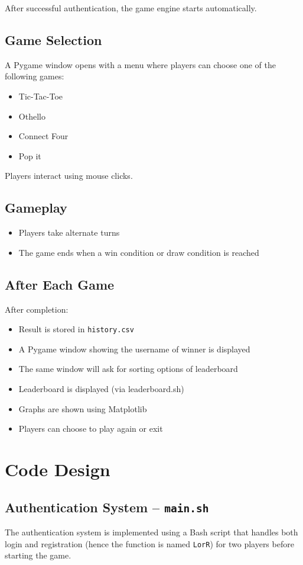\documentclass[12pt,a4paper]{article}
\begin{document}
After successful authentication, the game engine starts automatically.

\subsection{Game Selection}
A Pygame window opens with a menu where players can choose one of the following games:
\begin{itemize}
    \item Tic-Tac-Toe
    \item Othello
    \item Connect Four
    \item Pop it
\end{itemize}

Players interact using mouse clicks.

\subsection{Gameplay}
\begin{itemize}
    \item Players take alternate turns
    \item The game ends when a win condition or draw condition is reached
\end{itemize}

\subsection{After Each Game}
After completion:
\begin{itemize}
    \item Result is stored in \texttt{history.csv}
    \item A Pygame window showing the username of winner is displayed
    \item The same window will ask for sorting options of leaderboard
    \item Leaderboard is displayed (via leaderboard.sh)
    \item Graphs are shown using Matplotlib
    \item Players can choose to play again or exit
\end{itemize}


\section{Code Design}

\subsection{Authentication System -- \texttt{main.sh}}
The authentication system is implemented using a Bash script that handles both login and registration (hence the function is named \texttt{LorR}) for two players before starting the game.
\end{document}
